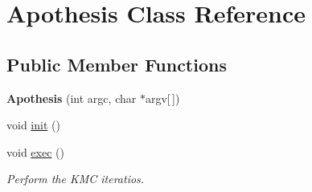 \hypertarget{classApothesis}{}\section{Apothesis Class Reference}
\label{classApothesis}
\subsection*{Public Member Functions}
\begin{DoxyCompactItemize}
\item 
\mbox{\label{classApothesis_a7977d54d81e24129bfacdd142fc8695f}} 
{\bfseries Apothesis} (int argc, char $\ast$argv\mbox{[}$\,$\mbox{]})
\item 
void \mbox{\hyperlink{classApothesis_acef1e97b07815dbc4879c28521b856ab}{init}} ()
\item 
void \mbox{\hyperlink{classApothesis_a423ade721d6955058ceca935908bada0}{exec}} ()
\begin{DoxyCompactList}\small\item\em Perform the K\+MC iteratios. \end{DoxyCompactList}\end{DoxyCompactItemize}
